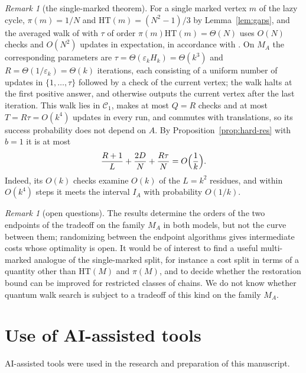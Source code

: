 \documentclass{amsart}
\theoremstyle{plain}
\theoremstyle{definition}
\theoremstyle{remark}
\newtheorem{remark}[theorem]{Remark}
\newcommand{\eps}{\varepsilon}
\newcommand{\con}{\mathcal{C}}
\newcommand{\HT}{\mathrm{HT}}
\begin{document}
\begin{remark}[the single-marked theorem]
For a single marked vertex $m$ of the lazy cycle, $\pi(m)=1/N$ and $\HT(m)=(N^2-1)/3$ by Lemma~\ref{lem:gaps}, and the averaged walk of \cite{AC} with $\tau$ of order $\pi(m)\HT(m)=\Theta(N)$ uses $O(N)$ checks and $O(N^2)$ updates in expectation, in accordance with \cite[Theorem~1]{AC}. On $M_A$ the corresponding parameters are $\tau=\Theta(\eps_kH_k)=\Theta(k^3)$ and $R=\Theta(1/\eps_k)=\Theta(k)$ iterations, each consisting of a uniform number of updates in $\{1,\dots,\tau\}$ followed by a check of the current vertex; the walk halts at the first positive answer, and otherwise outputs the current vertex after the last iteration. This walk lies in $\con_1$, makes at most $Q=R$ checks and at most $T=R\tau=O(k^4)$ updates in every run, and commutes with translations, so its success probability does not depend on $A$. By Proposition~\ref{prop:hard-res} with $b=1$ it is at most
\[
\frac{R+1}{L}+\frac{2D}{N}+\frac{R\tau}{N}=O\Bigl(\frac1k\Bigr).
\]
Indeed, its $O(k)$ checks examine $O(k)$ of the $L=k^2$ residues, and within $O(k^4)$ steps it meets the interval $I_A$ with probability $O(1/k)$.
\end{remark}

\begin{remark}[open questions]
The results determine the orders of the two endpoints of the tradeoff on the family $M_A$ in both models, but not the curve between them; randomizing between the endpoint algorithms gives intermediate costs whose optimality is open. It would be of interest to find a useful multi-marked analogue of the single-marked split, for instance a cost split in terms of a quantity other than $\HT(M)$ and $\pi(M)$, and to decide whether the restoration bound can be improved for restricted classes of chains. We do not know whether quantum walk search is subject to a tradeoff of this kind on the family $M_A$.
\end{remark}

\section*{Use of AI-assisted tools}
AI-assisted tools were used in the research and preparation of this manuscript.
\end{document}
